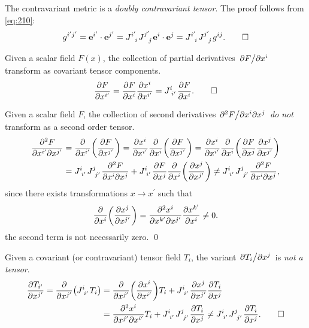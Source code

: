 \documentclass{article}
\begin{document}
	\begin{proposition}
		The contravariant metric is a \textit{doubly contravariant tensor}. The proof follows from \eqref{eq:210}:
		\begin{equation}
		g^{i^\prime j^\prime} = \vb{e}^{i^\prime} \cdot \vb{e}^{j^\prime} = J\indices{^{i^\prime}_{i}} J\indices{^{j^\prime}_{j}} \vb{e}^{i} \cdot \vb{e}^{j} = J\indices{^{i^\prime}_{i}} J\indices{^{j^\prime}_{j}} g^{ij}. \qed
		\end{equation}
	\end{proposition}
	\begin{proposition}
		Given a scalar field $ F(x) $, the collection of partial derivatives $ \pdv*{F}{x^{i}} $ transform as covariant tensor components.
		\[
		\pdv{F}{x^{i^\prime}} = \pdv{F}{x^{i}} \pdv{x^{i}}{x^{i^\prime}} = J\indices{^{i}_{i^\prime}} \pdv{F}{x^{i}}. \qed
		\]
	\end{proposition}
	\begin{proposition}
		Given a scalar field $ F $, the collection of second derivatives $ \pdv*{^2F}{x^{i}\partial x^{j}} $ \textit{do not} transform as a second order tensor.
		\begin{align*}
		\pdv{^2 F}{x^{i^\prime}\partial x^{j^\prime}} &= \pdv{}{x^{i^\prime}}\qty(\pdv{F}{x^{j^\prime}}) = \pdv{x^{i}}{x^{i^\prime}}\pdv{}{x^{i}} \qty(\pdv{F}{x^{j^\prime}}) = \pdv{x^{i}}{x^{i^\prime}}\pdv{}{x^{i}} \qty(\pdv{F}{x^{j}} \pdv{x^{j}}{x^{j^\prime}}) \\
		&= J\indices{^{i}_{i^\prime}} J\indices{^{j}_{j^\prime} }\pdv{^2 F}{x^{i}\partial x^{j}} + J\indices{^{i}_{i^\prime}} \pdv{F}{x^{j}} \pdv{}{x^{i}}\qty(\pdv{x^{j}}{x^{j^\prime}}) \neq J\indices{^{i}_{i^\prime}} J\indices{^{j}_{j^\prime}} \pdv{^2 F}{x^{i} \partial x^{j}},
		\end{align*}
		since there exists transformations $ x \to x^\prime $ such that
		\[
		\pdv{}{x^{i}}\qty(\pdv{x^{j}}{x^{j^\prime}}) = \pdv{^2 x^{i}}{x^{k^\prime} \partial x^{j^\prime}}\pdv{x^{k^\prime}}{x^{i}} \neq 0.
		\]
		the second term is not necessarily zero. \qed
	\end{proposition}
	\begin{proposition}
		Given a covariant (or contravariant) tensor field $ T_{i} $, the variant $ \pdv*{T_{i}}{x^{j}} $ is \textit{not a tensor}.
		\begin{align*}
		\pdv{T_{i^\prime}}{x^{j^\prime}} = \pdv{}{x^{j^\prime}} \qty( J\indices{^{i}_{i^\prime}} T_{i}) &= \pdv{}{x^{j^\prime}} \qty(\pdv{x^{i}}{x^{i^\prime}}) T_{i} + J\indices{^{i}_{i^\prime}} \pdv{x^{j}}{x^{j^\prime}} \pdv{T_{i}}{x^{j}} \\
		&= \pdv{^2 x^{i}}{x^{j^\prime} \partial x^{i^\prime}} T_{i} + J\indices{^{i}_{i^\prime}} J\indices{^{j}_{j^\prime}} \pdv{T_{i}}{x^{j}} \neq J\indices{^{i}_{i^\prime}} J\indices{^{j}_{j^\prime}} \pdv{T_{i}}{x^{j}}. \qed
		\end{align*}
	\end{proposition}
\end{document}
